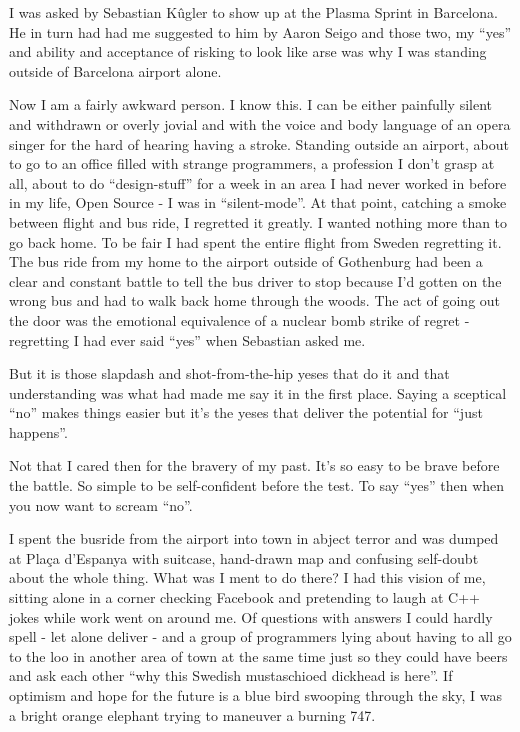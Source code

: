 I was asked by Sebastian Kûgler to show up at the Plasma Sprint in Barcelona. He in turn had had me suggested to him by Aaron Seigo and those two, my “yes” and ability and acceptance of risking to look like arse was why I was standing outside of Barcelona airport alone.

Now I am a fairly awkward person. I know this. I can be either painfully silent and withdrawn or overly jovial and with the voice and body language of an opera singer for the hard of hearing having a stroke. Standing outside an airport, about to go to an office filled with strange programmers, a profession I don't grasp at all, about to do “design-stuff” for a week in an area I had never worked in before in my life, Open Source - I was in “silent-mode”. 
At that point, catching a smoke between flight and bus ride, I regretted it greatly. I wanted nothing more than to go back home. To be fair I had spent the entire flight from Sweden regretting it. The bus ride from my home to the airport outside of Gothenburg had been a clear and constant battle to tell the bus driver to stop because I'd gotten on the wrong bus and had to walk back home through the woods. The act of going out the door was the emotional equivalence of a nuclear bomb strike of regret - regretting I had ever said “yes” when Sebastian asked me.

But it is those slapdash and shot-from-the-hip yeses that do it and that understanding was what had made me say it in the first place. Saying a sceptical “no” makes things easier but it's the yeses that deliver the potential for “just happens”.

Not that I cared then for the bravery of my past. It's so easy to be brave before the battle. So simple to be self-confident before the test. To say “yes” then when you now want to scream “no”.

I spent the busride from the airport into town in abject terror and was dumped at Plaça d'Espanya with suitcase, hand-drawn map and confusing self-doubt about the whole thing.
What was I ment to do there? I had this vision of me, sitting alone in a corner checking Facebook and pretending to laugh at C++ jokes while work went on around me. Of questions with answers I could hardly spell - let alone deliver - and a group of programmers lying about having to all go to the loo in another area of town at the same time just so they could have beers and ask each other “why this Swedish mustaschioed dickhead is here”. If optimism and hope for the future is a blue bird swooping through the sky, I was a bright orange elephant trying to maneuver a burning 747.

